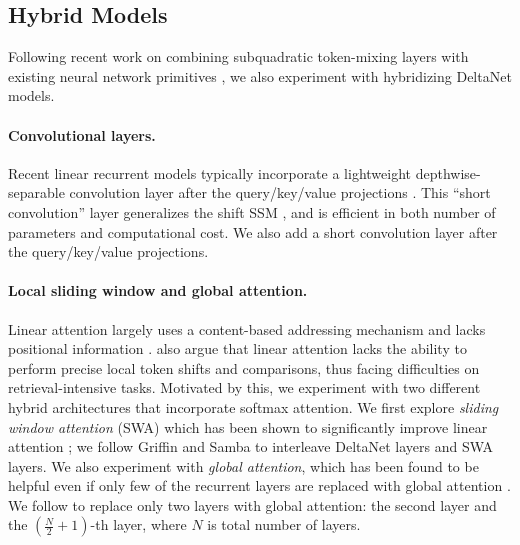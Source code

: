 \vspace{-2mm}
 \subsection{Hybrid Models}
 \vspace{-2mm}
Following recent work on combining subquadratic token-mixing layers with existing neural network primitives \citep{arora_simple_2024,de_griffin_2024,Lieber2024JambaAH}, we also experiment with hybridizing DeltaNet models.

 \vspace{-2mm}
\paragraph{Convolutional layers.} Recent linear recurrent models typically incorporate a lightweight depthwise-separable convolution layer after the query/key/value projections \cite{gu_mamba_2023,beck2024xlstm,mamba2}. This ``short convolution'' layer \cite{poli_hyena_2023} generalizes the shift SSM \cite{fu_hungry_2023}, and is
 efficient in both number of parameters  and computational cost. We also add a short convolution layer after the query/key/value projections. 
 

\vspace{-2mm}
\paragraph{Local sliding window and global attention.}
 Linear attention largely uses a content-based addressing mechanism \cite{graves_neural_2014} and lacks positional information \cite{zhang_linear_2023}. \citet{arora_simple_2024} also argue that linear attention lacks the ability to perform precise local token shifts and comparisons, thus facing difficulties on  retrieval-intensive tasks.   
  Motivated by this, we experiment with two different hybrid architectures that incorporate softmax attention. We first explore \textit{ sliding window attention} (SWA) which has been shown to significantly improve linear attention \cite{qin_devil_2022, arora_simple_2024, lingle_transformer-vq_2023, nahshan_linear_2024}; we follow Griffin \cite{de_griffin_2024} and Samba \cite{ren2024samba}  to interleave DeltaNet layers and SWA layers. We also experiment with \textit{global attention}, which has been found to be helpful  \cite{lei_when_2021, huang_encoding_2022} even if only few of the recurrent layers are replaced with global attention \cite{Lieber2024JambaAH}. We follow \citet{fu_hungry_2023} to replace only two layers with global attention: the second layer and the $(\frac{N}{2}+1)$-th  layer, where $N$ is total number of layers.

